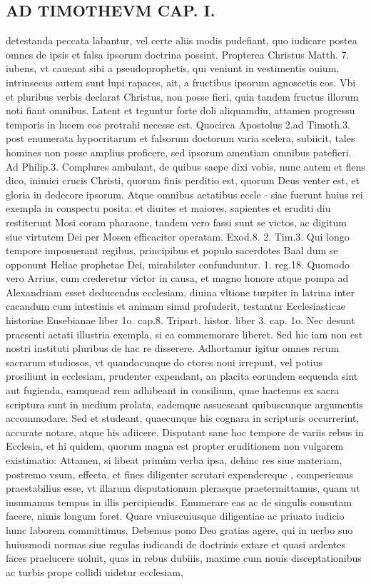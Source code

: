 \documentclass{article}
\begin{document}
\begin{pages}
\section*{AD TIMOTHEVM CAP. I. }
\marginpar{[ p.20 ]}\pstart detestanda peccata labantur, vel certe aliis modis pudefiant, quo iudicare postea omnes de ipsis et falsa ipsorum doctrina possint. Propterea Christus Matth. 7. iubens, vt caueant sibi a pseudoprophetis, qui veniunt in vestimentis ouium, intrinsecus autem sunt lupi rapaces, ait, a fructibus ipsorum agnoscetis eos. Vbi et pluribus verbis declarat Christus, non posse fieri, quin tandem fructus illorum noti fiant omnibus. Latent et teguntur forte doli aliquamdiu, attamen progressu temporis in lucem eos protrahi necesse est. Quocirca Apostolus 2.ad Timoth.3. post enumerata hypocritarum et falsorum doctorum varia scelera, subiicit, tales homines non posse amplius proficere, sed ipsorum amentiam omnibus patefieri. Ad Philip.3. Complures ambulant, de quibus saepe dixi vobis, nunc autem et flens dico, inimici crucis Christi, quorum finis perditio est,   quorum Deus venter est, et gloria in dedecore ipsorum. Atque  omnibus aetatibus eccle -  siae fuerunt huius rei exempla in conspectu posita: et diuites et maiores, sapientes et eruditi diu restiterunt Mosi coram pharaone, tandem vero fassi sunt se victos, ac digitum siue virtutem Dei per Mosen efficaciter operatam. Exod.8. 2. Tim.3. Qui longo tempore imposuerant regibus, principibus et populo sacerdotes Baal dum se opponunt Heliae prophetae Dei, mirabilster confunduntur. 1. reg.18. Quomodo vero Arrius, cum crederetur victor in causa, et magno honore atque pompa ad Alexandriam esset deducendus ecclesiam, diuina vltione turpiter in latrina inter cacandum cum intestinis et animam simul profuderit, testantur Ecclesiasticae historiae Eusebianae liber 1o. cap.8. Tripart. histor. liber 3. cap. 1o. Nec desunt praesenti aetati illustria exempla, si ea commemorare liberet. Sed hic iam non est nostri instituti pluribus de hac re disserere. Adhortamur igitur omnes rerum sacrarum studiosos, vt quandocunque  do ctores noui irrepunt, vel potius prosiliunt in ecclesiam, prudenter expendant, an placita eorundem sequenda sint aut fugienda, eamquead rem adhibeant in consilium, quae hactenus ex sacra scriptura sunt in medium prolata, eademque  assuescant quibuscunque  argumentis accommodare. Sed et studeant, quaecunque  his cognara in scripturis occurrerint, accurate notare, atque  his adiicere. Disputant sane hoc tempore de variis rebus in Ecclesia, et hi quidem, quorum magna est propter eruditionem non vulgarem existimatio: Attamen, si libeat primùm verba ipsa, dehinc res siue materiam, postremo vsum, effecta, et fines diligenter scrutari expendereque , comperiemus praestabilius esse, vt illarum disputationum plerasque  praetermittamus, quam ut insumamus tempus in illis percipiendis. Enumerare eas ac de singulis consutam facere, nimis longum foret. Quare vniuscuiusque  diligentiae ac priuato iudicio hunc laborem committimus, Debemus pono Deo gratias agere, qui in uerbo suo huiusmodi normas siue regulas iudicandi de doctrinis extare et quasi ardentes faces praelucere uoluit, quas in rebus dubiiis, maxime cum nouis disceptationibus ac turbis prope collidi uidetur ecclesiam, 
\end{pages}
\end{document}
